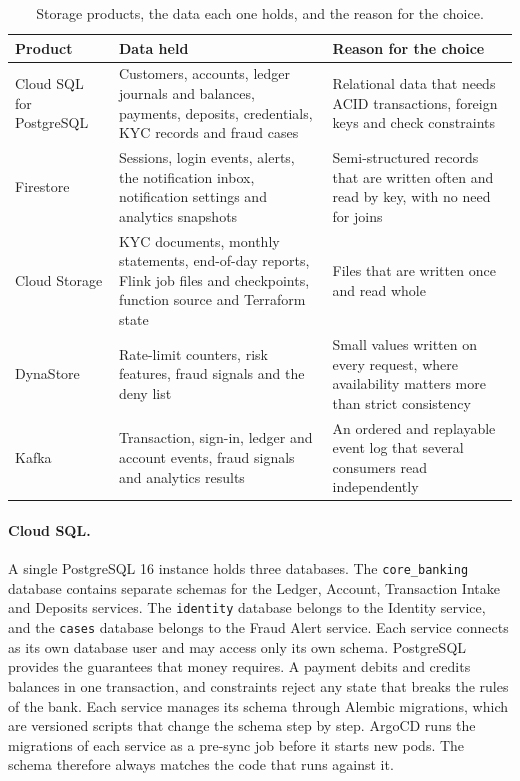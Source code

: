 \documentclass[11pt,a4paper]{article}
\newcommand{\code}[1]{\texttt{#1}}
\begin{document}
\begin{table}[H]\centering\small
\caption{Storage products, the data each one holds, and the reason for the choice.}\label{tab:storage}
\begin{tabularx}{\linewidth}{@{}L{2.6cm}YY@{}}
\toprule
Product & Data held & Reason for the choice \\
\midrule
Cloud SQL for PostgreSQL & Customers, accounts, ledger journals and balances, payments, deposits, credentials, KYC records and fraud cases & Relational data that needs ACID transactions, foreign keys and check constraints \\
Firestore & Sessions, login events, alerts, the notification inbox, notification settings and analytics snapshots & Semi-structured records that are written often and read by key, with no need for joins \\
Cloud Storage & KYC documents, monthly statements, end-of-day reports, Flink job files and checkpoints, function source and Terraform state & Files that are written once and read whole \\
DynaStore & Rate-limit counters, risk features, fraud signals and the deny list & Small values written on every request, where availability matters more than strict consistency \\
Kafka & Transaction, sign-in, ledger and account events, fraud signals and analytics results & An ordered and replayable event log that several consumers read independently \\
\bottomrule
\end{tabularx}
\end{table}

\paragraph{Cloud SQL.} A single PostgreSQL 16 instance holds three databases. The \code{core\_banking} database contains separate schemas for the Ledger, Account, Transaction Intake and Deposits services. The \code{identity} database belongs to the Identity service, and the \code{cases} database belongs to the Fraud Alert service. Each service connects as its own database user and may access only its own schema. PostgreSQL provides the guarantees that money requires. A payment debits and credits balances in one transaction, and constraints reject any state that breaks the rules of the bank. Each service manages its schema through Alembic migrations, which are versioned scripts that change the schema step by step. ArgoCD runs the migrations of each service as a pre-sync job before it starts new pods. The schema therefore always matches the code that runs against it.
\end{document}
